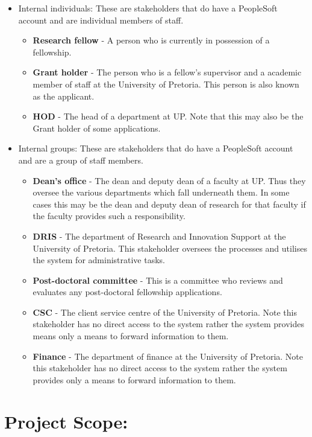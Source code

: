 \documentclass[12pt]{article}
\begin{document}
\begin{itemize}
\item Internal individuals:
These are stakeholders that do have a PeopleSoft account and are individual members of staff.
\begin{itemize}	
\item \textbf{Research fellow} - A person who is currently in possession of a fellowship.
\item \textbf{Grant holder} - The person who is a fellow's supervisor and a academic member of staff at the University of Pretoria. This person is also known as the applicant.
\item \textbf{HOD} - The head of a department at UP. Note that this may also be the Grant holder of some applications.
\end{itemize}
\item Internal groups:
These are stakeholders that do have a PeopleSoft account and are a group of staff members.
\begin{itemize}	
\item \textbf{Dean's office} - The dean and deputy dean of a faculty at UP. Thus they oversee the various departments which fall underneath them. In some cases this may be the dean and deputy dean of research for that faculty if the faculty provides such a responsibility.
\item \textbf{DRIS} - The department of Research and Innovation Support at the University of Pretoria. This stakeholder oversees the processes and utilises the system for administrative tasks.
\item \textbf{Post-doctoral committee} - This is a committee who reviews and evaluates any post-doctoral fellowship applications.
\item \textbf{CSC} - The client service centre of the University of Pretoria. Note this stakeholder has no direct access to the system rather the system provides means only a means to forward information to them.
\item \textbf{Finance} - The department of finance at the University of Pretoria. Note this stakeholder has no direct access to the system rather the system provides only a means to forward information to them.
\end{itemize}
\end{itemize}
\vspace{0.5in}

\newpage
\section{Project Scope:}
\vspace{0.2in}
\end{document}
